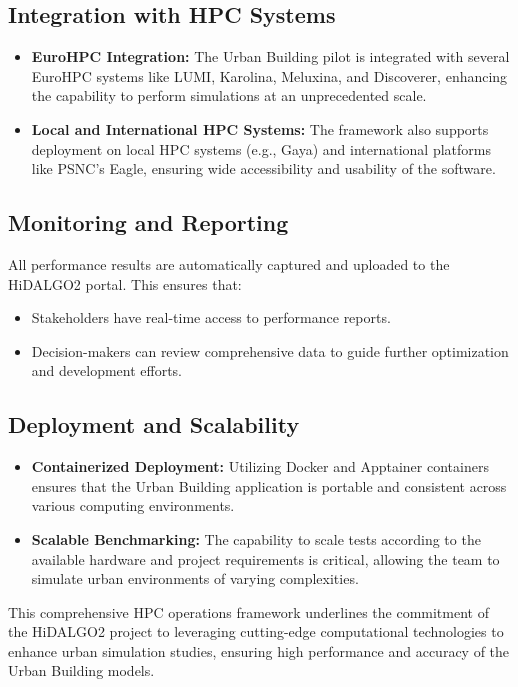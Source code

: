 \documentclass[runningheads]{llncs}
\begin{document}
\subsection{Integration with HPC Systems}
\begin{itemize}
    \item \textbf{EuroHPC Integration:} The Urban Building pilot is integrated with several EuroHPC systems like LUMI, Karolina, Meluxina, and Discoverer, enhancing the capability to perform simulations at an unprecedented scale.
    \item \textbf{Local and International HPC Systems:} The framework also supports deployment on local HPC systems (e.g., Gaya) and international platforms like PSNC's Eagle, ensuring wide accessibility and usability of the software.
\end{itemize}

\subsection{Monitoring and Reporting}
All performance results are automatically captured and uploaded to the HiDALGO2 portal. This ensures that:
\begin{itemize}
    \item Stakeholders have real-time access to performance reports.
    \item Decision-makers can review comprehensive data to guide further optimization and development efforts.
\end{itemize}

\subsection{Deployment and Scalability}
\begin{itemize}
    \item \textbf{Containerized Deployment:} Utilizing Docker and Apptainer containers ensures that the Urban Building application is portable and consistent across various computing environments.
    \item \textbf{Scalable Benchmarking:} The capability to scale tests according to the available hardware and project requirements is critical, allowing the team to simulate urban environments of varying complexities.
\end{itemize}

This comprehensive HPC operations framework underlines the commitment of the HiDALGO2 project to leveraging cutting-edge computational technologies to enhance urban simulation studies, ensuring high performance and accuracy of the Urban Building models.
\end{document}
